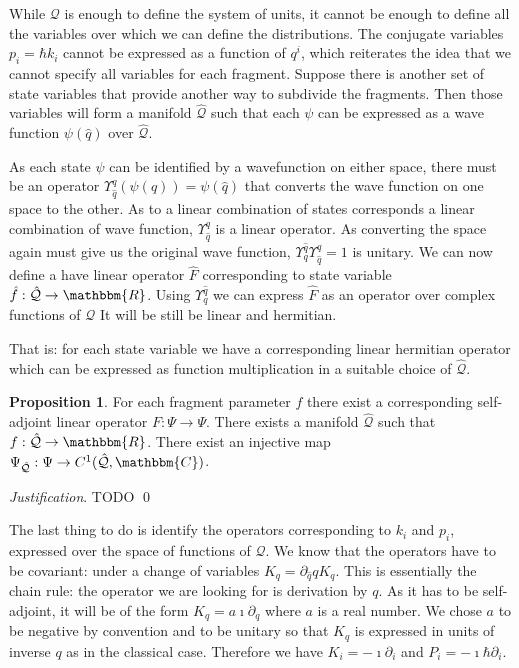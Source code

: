 \documentclass[aps,pra,10pt,twocolumn,floatfix,nofootinbib]{revtex4-1}
\numberwithin{equation}{section}
\theoremstyle{definition}
\newtheorem{prop}[equation]{Proposition}
\newenvironment{justification}{\emph{Justification}.}{\qed}
\begin{document}
While $\mathcal{Q}$ is enough to define the system of units, it cannot be enough to define all the variables over which we can define the distributions. The conjugate variables $p_i=\hbar k_i$ cannot be expressed as a function of $q^i$, which reiterates the idea that we cannot specify all variables for each fragment. Suppose there is another set of state variables that provide another way to subdivide the fragments. Then those variables will form a manifold $\hat{\mathcal{Q}}$ such that each $\psi$ can be expressed as a wave function $\psi(\hat{q})$ over $\hat{\mathcal{Q}}$.

As each state $\psi$ can be identified by a wavefunction on either space, there must be an operator $\Upsilon^q_{\hat{q}}(\psi(q)) = \psi(\hat{q})$ that converts the wave function on one space to the other. As to a linear combination of states corresponds a linear combination of wave function, $\Upsilon^q_{\hat{q}}$ is a linear operator. As converting the space again must give us the original wave function, $\Upsilon^{\hat{q}}_{q} \Upsilon^q_{\hat{q}}= 1$ is unitary. We can now define a have linear operator $\hat{F}$ corresponding to state variable $\hat{f} : \hat{\mathcal{Q}} \rightarrow \mathbbm{R}$. Using $\Upsilon^{\hat{q}}_{q}$ we can express $\hat{F}$ as an operator over complex functions of $\mathcal{Q}$ It will be still be linear and hermitian.

That is: for each state variable we have a corresponding linear hermitian operator which can be expressed as function multiplication in a suitable choice of $\hat{\mathcal{Q}}$.

\begin{prop}\label{prop:self_adjoint_operators}
	For each fragment parameter $f$ there exist a corresponding self-adjoint linear operator $F : \Psi \rightarrow \Psi$. There exists a manifold $\hat{\mathcal{Q}}$ such that $f : \hat{\mathcal{Q}} \rightarrow \mathbbm{R}$. There exist an injective map $\Psi_{\hat{\mathcal{Q}}} : \Psi \rightarrow C^1(\hat{\mathcal{Q}}, \mathbbm{C})$.
\end{prop}
\begin{justification}
	TODO
\end{justification}

The last thing to do is identify the operators corresponding to $k_i$ and $p_i$, expressed over the space of functions of $\mathcal{Q}$. We know that the operators have to be covariant: under a change of variables $K_{\hat{q}} = \partial_{\hat{q}} q K_{q}$. This is essentially the chain rule: the operator we are looking for is derivation by $q$. As it has to be self-adjoint, it will be of the form $K_{q} = a \imath \partial_q$ where $a$ is a real number. We chose $a$ to be negative by convention and to be unitary so that $K_{q}$ is expressed in units of inverse $q$ as in the classical case. Therefore we have $K_{i} = -\imath \partial_i$ and $P_{i} = -\imath \hbar \partial_i$.
\end{document}
